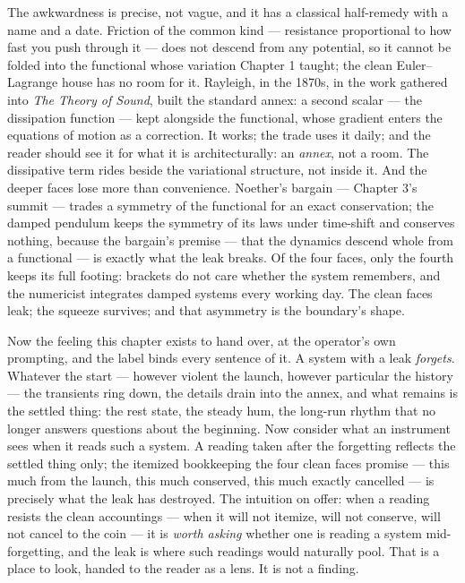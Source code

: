 The awkwardness is precise, not vague, and it has a classical
half-remedy with a name and a date. Friction of the common kind ---
resistance proportional to how fast you push through it --- does not
descend from any potential, so it cannot be folded into the functional
whose variation Chapter 1 taught; the clean Euler--Lagrange house has no
room for it. Rayleigh, in the 1870s, in the work gathered into
\emph{The Theory of Sound}, built the standard annex: a second scalar
--- the dissipation function --- kept alongside the functional, whose
gradient enters the equations of motion as a correction. It works; the
trade uses it daily; and the reader should see it for what it is
architecturally: an \emph{annex}, not a room. The dissipative term rides
beside the variational structure, not inside it. And the deeper faces
lose more than convenience. Noether's bargain --- Chapter 3's summit ---
trades a symmetry of the functional for an exact conservation; the
damped pendulum keeps the symmetry of its laws under time-shift and
conserves nothing, because the bargain's premise --- that the dynamics
descend whole from a functional --- is exactly what the leak breaks. Of
the four faces, only the fourth keeps its full footing: brackets do not
care whether the system remembers, and the numericist integrates damped
systems every working day. The clean faces leak; the squeeze survives;
and that asymmetry is the boundary's shape.

\begin{intuition}
Now the feeling this chapter exists to hand over, at the operator's own
prompting, and the label binds every sentence of it. A system with a
leak \emph{forgets}. Whatever the start --- however violent the launch,
however particular the history --- the transients ring down, the
details drain into the annex, and what remains is the settled thing:
the rest state, the steady hum, the long-run rhythm that no longer
answers questions about the beginning. Now consider what an instrument
sees when it reads such a system. A reading taken after the forgetting
reflects the settled thing only; the itemized bookkeeping the four
clean faces promise --- this much from the launch, this much conserved,
this much exactly cancelled --- is precisely what the leak has
destroyed. The intuition on offer: when a reading resists the clean
accountings --- when it will not itemize, will not conserve, will not
cancel to the coin --- it is \emph{worth asking} whether one is reading
a system mid-forgetting, and the leak is where such readings would
naturally pool. That is a place to look, handed to the reader as a
lens. It is not a finding.
\end{intuition}

